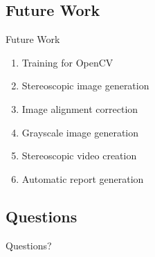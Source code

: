 \documentclass[17pt, aspectratio=169]{beamer}
\begin{document}
\subsection*{Future Work}
\begin{frame}{Future Work}
	\begin{enumerate}
		\item Training for OpenCV
		\item Stereoscopic image generation
		\item Image alignment correction
                \item Grayscale image generation
		\item Stereoscopic video creation
		\item Automatic report generation
	\end{enumerate}
\end{frame}
\subsection*{Questions}
\begin{frame}
	\begin{center}
		\begin{huge}
			Questions?
		\end{huge}
	\end{center}
\end{frame}
\end{document}
